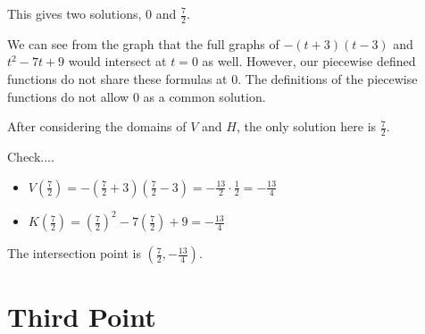 \documentclass{ximera}
\begin{document}
This gives two solutions, $0$ and $\frac{7}{2}$.  


We can see from the graph that the full graphs of $-(t+3)(t-3)$ and $t^2 - 7 t + 9$ would intersect at $t = 0$ as well.  However, our piecewise defined functions do not share these formulas at $0$.  The definitions of the piecewise functions do not allow $0$ as a common solution.

After considering the domains of $V$ and $H$, the only solution here is $\frac{7}{2}$.






Check....
\begin{itemize}
\item $V(\tfrac{7}{2}) = -\left(\tfrac{7}{2} + 3\right) \left(\tfrac{7}{2} - 3\right) = -\tfrac{13}{2}  \cdot \tfrac{1}{2} = -\frac{13}{4}$
\item $K(\tfrac{7}{2}) =   \left(\tfrac{7}{2}\right)^2 - 7\left(\tfrac{7}{2}\right) + 9 = -\frac{13}{4}$
\end{itemize}


The intersection point is $\left(\tfrac{7}{2}, -\frac{13}{4}\right)$.

















\section{Third Point}
\end{document}
